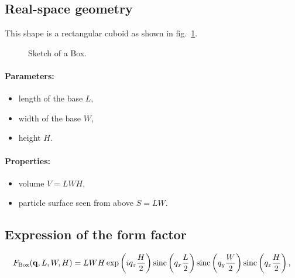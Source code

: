 \subsection{Real-space geometry}
This shape is a rectangular cuboid as
shown in fig.~\ref{fig:box}. 


\begin{figure}[ht]
\hfill
{}
\hfill
{}
\hfill
\caption{Sketch of a Box.}
\label{fig:box}
\end{figure}

\FloatBarrier


\paragraph{Parameters:}
\begin{itemize}
\item length of the base $L$,
\item width of the base $W$,
\item height  $H$.
\end{itemize}

\paragraph{Properties:}
\begin{itemize}
\item volume $V= LWH$,
\item particle surface seen from above $S = LW$.
\end{itemize}

\subsection{Expression of the form factor}

\begin{equation*}
F_{\rm{Box}}(\mathbf{q},L,W,H)= L W H\exp\left(i q_z \frac{H}{2}\right) \operatorname{sinc}\left(q_x \frac{L}{2}\right)
\operatorname{sinc}\left(q_y \frac{W}{2}\right) \operatorname{sinc}\left(q_z \frac{H}{2}\right),
\end{equation*}
    
